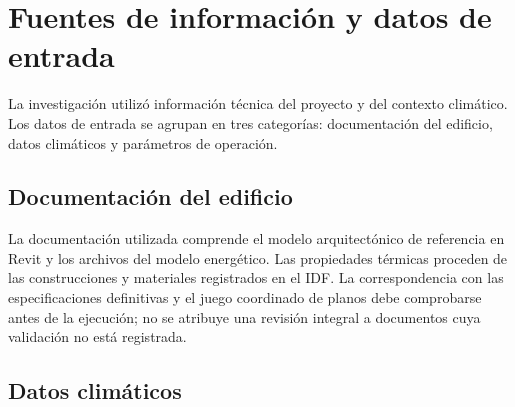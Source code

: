 \section{Fuentes de información y datos de entrada}

\begin{textoDosTercios}
La investigación utilizó información técnica del proyecto y del contexto climático. Los datos de entrada se agrupan en tres categorías: documentación del edificio, datos climáticos y parámetros de operación.

\subsection{Documentación del edificio}

La documentación utilizada comprende el modelo arquitectónico de referencia en Revit y los archivos del modelo energético. Las propiedades térmicas proceden de las construcciones y materiales registrados en el IDF. La correspondencia con las especificaciones definitivas y el juego coordinado de planos debe comprobarse antes de la ejecución; no se atribuye una revisión integral a documentos cuya validación no está registrada.
\end{textoDosTercios}

\par\medskip

\subsection{Datos climáticos}

